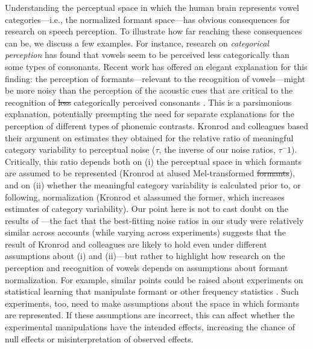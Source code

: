 \documentclass[preprint]{JASA}
\providecommand{\DIFadd}[1]{{\protect\color{blue}\uwave{#1}}} %
\providecommand{\DIFdel}[1]{{\protect\color{red}\sout{#1}}}                      %
\providecommand{\DIFaddbegin}{} %
\providecommand{\DIFaddend}{} %
\providecommand{\DIFdelbegin}{} %
\providecommand{\DIFdelend}{} %
\begin{document}
Understanding the perceptual space in which the human brain represents vowel categories---i.e., the normalized formant space---has obvious consequences for research on speech perception. To illustrate how far reaching these consequences can be, we discuss a few examples. For instance, research on \emph{categorical perception} has found that vowels seem to be perceived less categorically than some types of consonants. Recent work has offered an elegant explanation for this finding: the perception of formants---relevant to the recognition of vowels---might be more noisy than the perception of the acoustic cues that are critical to the recognition of \DIFdelbegin \DIFdel{less }\DIFdelend \DIFaddbegin \DIFadd{more }\DIFaddend categorically perceived consonants \citep{kronrod2016}. This is a parsimonious explanation, potentially preempting the need for separate explanations for the perception of different types of phonemic contrasts. Kronrod and colleagues based their argument on estimates they obtained for the relative ratio of meaningful category variability to perceptual noise (\(\tau\), the inverse of our noise ratios, \(\tau^-1\)). Critically, this ratio depends both on (i) the perceptual space in which formants are assumed to be represented (Kronrod at al\DIFaddbegin \DIFadd{.~}\DIFaddend used Mel-transformed \DIFdelbegin \DIFdel{formants}\DIFdelend \DIFaddbegin \DIFadd{formant frequencies}\DIFaddend ), and on (ii) whether the meaningful category variability is calculated prior to, or following, normalization (Kronrod et al\DIFaddbegin \DIFadd{.~}\DIFaddend assumed the former, which increases estimates of category variability). Our point here is not to cast doubt on the results of \citet{kronrod2016} ---the fact that the best-fitting noise ratios in our study were relatively similar across accounts (while varying across experiments) suggests that the result of Kronrod and colleagues are likely to hold even under different assumptions about (i) and (ii)---but rather to highlight how research on the perception and recognition of vowels depends on assumptions about formant normalization. For example, similar points could be raised about experiments on statistical learning that manipulate formant or other frequency statistics \citep[e.g.,][]{chladkova2017, colby2018, xie2021, wade2007}. Such experiments, too, need to make assumptions about the space in which formants are represented. If these assumptions are incorrect, this can affect whether the experimental manipulations have the intended effects, increasing the chance of null effects or misinterpretation of observed effects.
\end{document}
